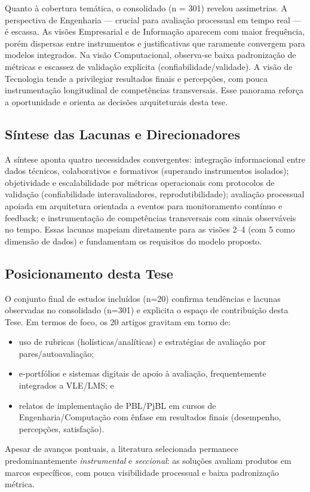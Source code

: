 \documentclass[12pt,a4paper]{article}
\begin{document}
Quanto à cobertura temática, o consolidado (n = 301) revelou assimetrias. A perspectiva de Engenharia — crucial para avaliação processual em tempo real — é escassa. As visões Empresarial e de Informação aparecem com maior frequência, porém dispersas entre instrumentos e justificativas que raramente convergem para modelos integrados. Na visão Computacional, observa‑se baixa padronização de métricas e escassez de validação explícita (confiabilidade/validade). A visão de Tecnologia tende a privilegiar resultados finais e percepções, com pouca instrumentação longitudinal de competências transversais. Esse panorama reforça a oportunidade e orienta as decisões arquiteturais desta tese.

\subsection{Síntese das Lacunas e Direcionadores}

A síntese aponta quatro necessidades convergentes: integração informacional entre dados técnicos, colaborativos e formativos (superando instrumentos isolados); objetividade e escalabilidade por métricas operacionais com protocolos de validação (confiabilidade interavaliadores, reprodutibilidade); avaliação processual apoiada em arquitetura orientada a eventos para monitoramento contínuo e feedback; e instrumentação de competências transversais com sinais observáveis no tempo. Essas lacunas mapeiam diretamente para as visões 2–4 (com 5 como dimensão de dados) e fundamentam os requisitos do modelo proposto.

\subsection{Posicionamento desta Tese}

O conjunto final de estudos incluídos (n=20) confirma tendências e lacunas observadas no consolidado (n=301) e explicita o espaço de contribuição desta Tese. Em termos de foco, os 20 artigos gravitam em torno de:
\begin{itemize}
  \item uso de rubricas (holísticas/analíticas) e estratégias de avaliação por pares/autoavaliação;
  \item e‑portfólios e sistemas digitais de apoio à avaliação, frequentemente integrados a VLE/LMS; e
  \item relatos de implementação de PBL/PjBL em cursos de Engenharia/Computação com ênfase em resultados finais (desempenho, percepções, satisfação).
\end{itemize}
Apesar de avanços pontuais, a literatura selecionada permanece predominantemente \emph{instrumental} e \emph{seccional}: as soluções avaliam produtos em marcos específicos, com pouca visibilidade processual e baixa padronização métrica.
\end{document}
